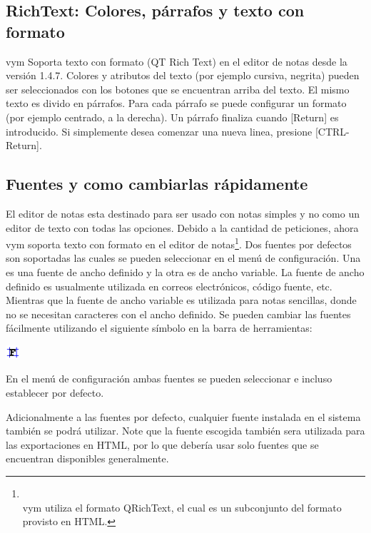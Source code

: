 \documentclass{article}
\newcommand{\vym}{{\sc vym }}
\newcommand{\key}[1]{[#1]}
\begin{document}
\subsection{RichText: Colores, p\'arrafos y texto con formato}
\vym Soporta texto con formato (QT Rich Text) en el editor de notas desde la versi\'on 1.4.7. Colores y atributos del texto (por ejemplo cursiva, negrita) pueden ser seleccionados con los botones que se encuentran arriba del texto. El mismo texto es divido en p\'arrafos. Para cada p\'arrafo se puede configurar un formato (por ejemplo centrado, a la derecha). Un p\'arrafo finaliza cuando \key{Return} es introducido. Si simplemente desea comenzar una nueva linea, presione \key{CTRL-Return}.

\subsection{Fuentes y como cambiarlas r\'apidamente}
El editor de notas esta destinado para ser usado con notas simples y no como un editor de texto con todas las opciones. Debido a la cantidad de peticiones, ahora \vym soporta texto con formato en el editor de notas\footnote{
    \\vym utiliza el formato QRichText, el cual es un subconjunto del formato provisto en HTML.}. 
Dos fuentes por defectos son soportadas las cuales se pueden seleccionar en el men\'u de configuraci\'on. Una es una fuente de ancho definido y la otra es de ancho variable. La fuente de ancho definido es usualmente utilizada en correos electr\'onicos, c\'odigo fuente, etc. Mientras que la fuente de ancho variable es utilizada para notas sencillas, donde no se necesitan caracteres con el ancho definido. Se pueden cambiar las fuentes f\'acilmente utilizando el siguiente s\'imbolo en la barra de herramientas:
\begin{center}
    \includegraphics[width=0.5cm]{images/formatfixedfont.png}
\end{center}
En el men\'u de configuraci\'on ambas fuentes se pueden seleccionar e incluso establecer por defecto.

Adicionalmente a las fuentes por defecto, cualquier fuente instalada en el sistema tambi\'en se podr\'a utilizar. Note que la fuente escogida tambi\'en sera utilizada para las exportaciones en HTML, por lo que deber\'ia usar solo fuentes que se encuentran disponibles generalmente.
\end{document}
